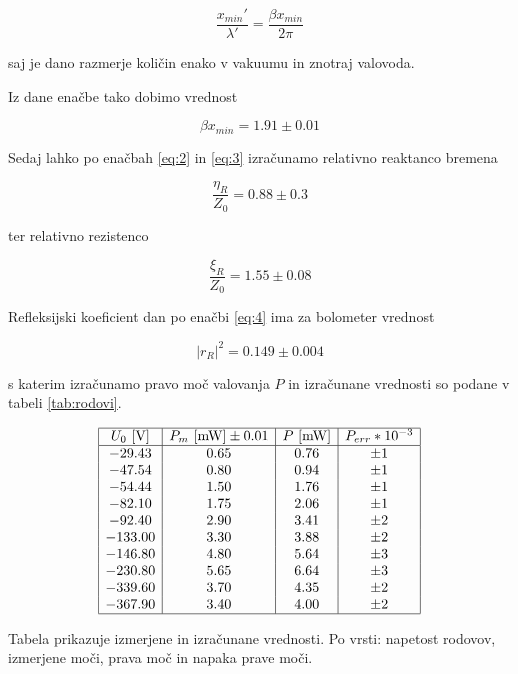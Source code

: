 \documentclass[11pt]{article}
\begin{document}
\begin{equation}
\label{eq:5}
\frac{x_{min}' }{\lambda'} = \frac{\beta x_{min}}{2 \pi}
\end{equation}

saj je dano razmerje količin enako v vakuumu in znotraj valovoda.

Iz dane enačbe tako dobimo vrednost

\[ \beta x_{min} = 1.91 \pm 0.01
\]


Sedaj lahko po enačbah \ref{eq:2} in \ref{eq:3} izračunamo relativno reaktanco
bremena

\[ \frac{\eta_R}{Z_0} = 0.88 \pm 0.3
\]

ter relativno rezistenco

\[ \frac{\xi_R}{Z_0} = 1.55 \pm 0.08
\]

Refleksijski koeficient dan po enačbi \ref{eq:4} ima za bolometer vrednost

\[ \left| r_R \right| ^2 = 0.149 \pm 0.004
\]

s katerim izračunamo pravo moč valovanja \(P\) in izračunane vrednosti
so podane v tabeli \ref{tab:rodovi}.

\begin{tabela}
  \centering
\[
  \begin{array}{|c|c|c|c|}\hline
    U_{0}\  [\mathrm{V}] & P_{m} \ [\mathrm{mW}] \pm 0.01 & P \ [\mathrm{mW}] & P_{err} * 10^{-3} \\ \hline
-29.43 & 0.65 & 0.76 & \pm 1 \\
-47.54 & 0.80 & 0.94 & \pm 1 \\
-54.44 & 1.50 & 1.76 & \pm 1 \\
-82.10 & 1.75 & 2.06 & \pm 1 \\
-92.40 & 2.90 & 3.41 & \pm 2 \\
-133.00 & 3.30 & 3.88 & \pm 2 \\
-146.80 & 4.80 & 5.64 & \pm 3 \\
-230.80 & 5.65 & 6.64 & \pm 3 \\
-339.60 & 3.70 & 4.35 & \pm 2 \\
-367.90 & 3.40 & 4.00 & \pm 2 \\\hline
    \end{array}
\]
\caption{\small Tabela prikazuje izmerjene in izračunane vrednosti. Po vrsti:
napetost rodovov, izmerjene moči, prava moč in napaka prave moči.}\label{tab:rodovi}
\end{tabela}

\nocite{*}
\printbibliography[heading=bibintoc]
\end{document}
